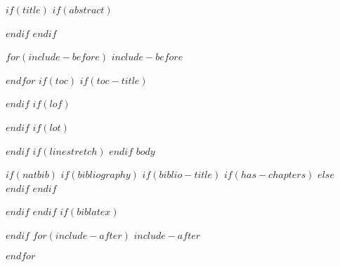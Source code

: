 \documentclass[
$if(fontsize)$
  $fontsize$,
$endif$
  ignorenonframetext,
$if(handout)$
  handout,
$endif$
$if(aspectratio)$
  aspectratio=$aspectratio$,
$endif$
$if(babel-lang)$
  $babel-lang$,
$endif$
$for(classoption)$
  $classoption$$sep$,
$endfor$
]{$documentclass$}
\title$if(shorttitle)$[$shorttitle$]$endif${$title$$if(thanks)$\thanks{$thanks$}$endif$}
\subtitle$if(shortsubtitle)$[$shortsubtitle$]$endif${$subtitle$}
\author$if(shortauthor)$[$shortauthor$]$endif${$for(author)$$author$$sep$ \and $endfor$}
\date$if(shortdate)$[$shortdate$]$endif${$date$}
\institute$if(shortinstitute)$[$shortinstitute$]$endif${$for(institute)$$institute$$sep$ \and $endfor$}
\newif\ifbibliography
\begin{document}
$if(title)$
\frame{\titlepage}
$if(abstract)$
\begin{abstract}
$abstract$
\end{abstract}
$endif$
$endif$

$for(include-before)$
$include-before$

$endfor$
$if(toc)$
$if(toc-title)$
\renewcommand*\contentsname{$toc-title$}

\setcounter{tocdepth}{$toc-depth$}
\tableofcontents

$endif$
$if(lof)$
\listoffigures
$endif$
$if(lot)$
\listoftables
$endif$
$if(linestretch)$
$endif$
$body$

$if(natbib)$
$if(bibliography)$
$if(biblio-title)$
$if(has-chapters)$
\renewcommand\bibname{$biblio-title$}
$else$
\renewcommand\refname{$biblio-title$}
$endif$
$endif$

$endif$
$endif$
$if(biblatex)$

$endif$
$for(include-after)$
$include-after$

$endfor$
\end{document}
